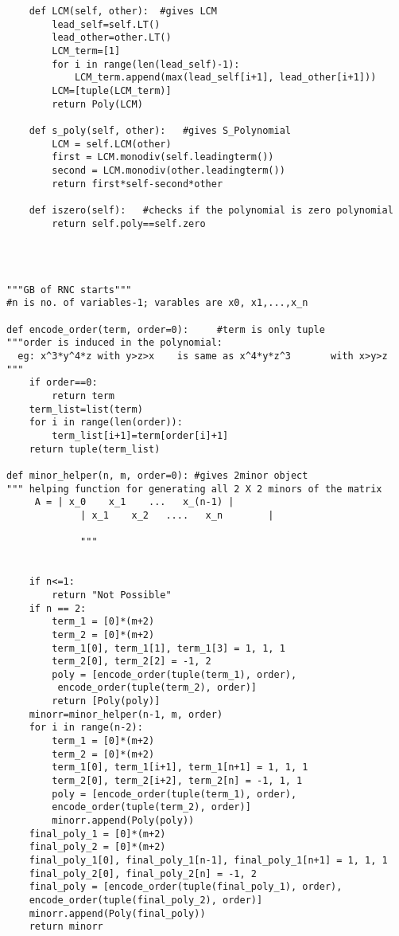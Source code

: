 \documentclass[12pt,a4paper]{article}
\theoremstyle{definition}
\begin{document}
\begin{verbatim}
    def LCM(self, other):  #gives LCM
        lead_self=self.LT()
        lead_other=other.LT()
        LCM_term=[1]
        for i in range(len(lead_self)-1):
            LCM_term.append(max(lead_self[i+1], lead_other[i+1]))
        LCM=[tuple(LCM_term)]
        return Poly(LCM)

    def s_poly(self, other):   #gives S_Polynomial
        LCM = self.LCM(other)
        first = LCM.monodiv(self.leadingterm())
        second = LCM.monodiv(other.leadingterm())
        return first*self-second*other

    def iszero(self):   #checks if the polynomial is zero polynomial
        return self.poly==self.zero
        
            


"""GB of RNC starts"""
#n is no. of variables-1; varables are x0, x1,...,x_n

def encode_order(term, order=0):     #term is only tuple
"""order is induced in the polynomial:
  eg: x^3*y^4*z with y>z>x    is same as x^4*y*z^3       with x>y>z  """
    if order==0:
        return term
    term_list=list(term)
    for i in range(len(order)):
        term_list[i+1]=term[order[i]+1]
    return tuple(term_list)

def minor_helper(n, m, order=0): #gives 2minor object
""" helping function for generating all 2 X 2 minors of the matrix
     A = | x_0    x_1    ...   x_(n-1) |
             | x_1    x_2   ....   x_n        |
             
             """
             
             
    if n<=1:
        return "Not Possible"
    if n == 2:
        term_1 = [0]*(m+2)
        term_2 = [0]*(m+2)
        term_1[0], term_1[1], term_1[3] = 1, 1, 1
        term_2[0], term_2[2] = -1, 2
        poly = [encode_order(tuple(term_1), order),
         encode_order(tuple(term_2), order)]
        return [Poly(poly)]
    minorr=minor_helper(n-1, m, order)
    for i in range(n-2):
        term_1 = [0]*(m+2)
        term_2 = [0]*(m+2)
        term_1[0], term_1[i+1], term_1[n+1] = 1, 1, 1
        term_2[0], term_2[i+2], term_2[n] = -1, 1, 1
        poly = [encode_order(tuple(term_1), order), 
        encode_order(tuple(term_2), order)]
        minorr.append(Poly(poly))
    final_poly_1 = [0]*(m+2)
    final_poly_2 = [0]*(m+2)
    final_poly_1[0], final_poly_1[n-1], final_poly_1[n+1] = 1, 1, 1
    final_poly_2[0], final_poly_2[n] = -1, 2
    final_poly = [encode_order(tuple(final_poly_1), order), 
    encode_order(tuple(final_poly_2), order)]
    minorr.append(Poly(final_poly))
    return minorr


\end{verbatim}
\end{document}
